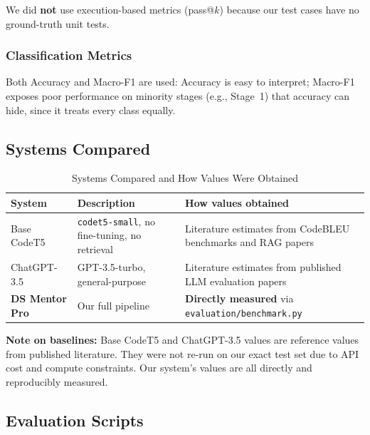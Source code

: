 \documentclass[12pt,a4paper]{article}
\begin{document}
We did \textbf{not} use execution-based metrics (pass@$k$) because our test cases have no ground-truth unit tests.

\subsubsection{Classification Metrics}

Both Accuracy and Macro-F1 are used: Accuracy is easy to interpret; Macro-F1 exposes poor performance on minority stages (e.g., Stage~1) that accuracy can hide, since it treats every class equally.

\subsection{Systems Compared}

\begin{table}[h!]
\centering
\caption{Systems Compared and How Values Were Obtained}
\small
\begin{tabularx}{\textwidth}{llX}
\toprule
System & Description & How values obtained \\
\midrule
Base CodeT5 & \texttt{codet5-small}, no fine-tuning, no retrieval & Literature estimates from CodeBLEU benchmarks and RAG papers \\
ChatGPT-3.5 & GPT-3.5-turbo, general-purpose & Literature estimates from published LLM evaluation papers \\
\textbf{DS Mentor Pro} & Our full pipeline & \textbf{Directly measured} via \texttt{evaluation/benchmark.py} \\
\bottomrule
\end{tabularx}
\end{table}

\textbf{Note on baselines:} Base CodeT5 and ChatGPT-3.5 values are reference values from published literature. They were not re-run on our exact test set due to API cost and compute constraints. Our system's values are all directly and reproducibly measured.

\subsection{Evaluation Scripts}
\end{document}
